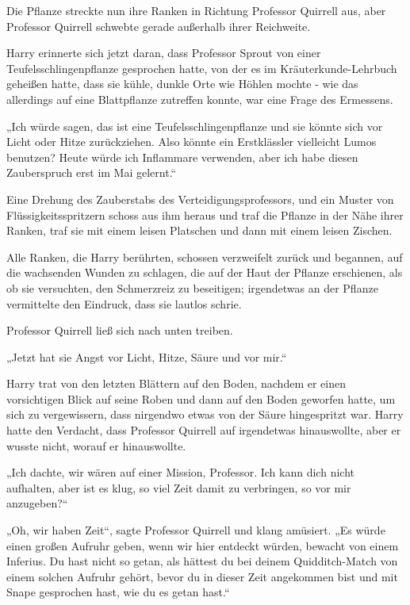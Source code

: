 {Die Pflanze streckte nun ihre Ranken in Richtung Professor Quirrell aus, aber Professor Quirrell schwebte gerade außerhalb ihrer Reichweite.

Harry erinnerte sich jetzt daran, dass Professor Sprout von einer Teufelsschlingenpflanze gesprochen hatte, von der es im Kräuterkunde-Lehrbuch geheißen hatte, dass sie kühle, dunkle Orte wie Höhlen mochte - wie das allerdings auf eine Blattpflanze zutreffen konnte, war eine Frage des Ermessens.

„Ich würde sagen, das ist eine Teufelsschlingenpflanze und sie könnte sich vor Licht oder Hitze zurückziehen. Also könnte ein Erstklässler vielleicht Lumos benutzen? Heute würde ich Inflammare verwenden, aber ich habe diesen Zauberspruch erst im Mai gelernt.“

Eine Drehung des Zauberstabs des Verteidigungsprofessors, und ein Muster von Flüssigkeitsspritzern schoss aus ihm heraus und traf die Pflanze in der Nähe ihrer Ranken, traf sie mit einem leisen Platschen und dann mit einem leisen Zischen.

Alle Ranken, die Harry berührten, schossen verzweifelt zurück und begannen, auf die wachsenden Wunden zu schlagen, die auf der Haut der Pflanze erschienen, als ob sie versuchten, den Schmerzreiz zu beseitigen; irgendetwas an der Pflanze vermittelte den Eindruck, dass sie lautlos schrie.

Professor Quirrell ließ sich nach unten treiben.

„Jetzt hat sie Angst vor Licht, Hitze, Säure und vor mir.“

Harry trat von den letzten Blättern auf den Boden, nachdem er einen vorsichtigen Blick auf seine Roben und dann auf den Boden geworfen hatte, um sich zu vergewissern, dass nirgendwo etwas von der Säure hingespritzt war. Harry hatte den Verdacht, dass Professor Quirrell auf irgendetwas hinauswollte, aber er wusste nicht, worauf er hinauswollte.

„Ich dachte, wir wären auf einer Mission, Professor. Ich kann dich nicht aufhalten, aber ist es klug, so viel Zeit damit zu verbringen, so vor mir anzugeben?“

„Oh, wir haben Zeit“, sagte Professor Quirrell und klang amüsiert. „Es würde einen großen Aufruhr geben, wenn wir hier entdeckt würden, bewacht von einem Inferius. Du hast nicht so getan, als hättest du bei deinem Quidditch-Match von einem solchen Aufruhr gehört, bevor du in dieser Zeit angekommen bist und mit Snape gesprochen hast, wie du es getan hast.“

}
